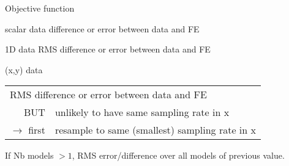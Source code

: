 \begin{frame}{Objective function}
\hfill

\begin{block}{scalar data}
difference or error between data and FE
\end{block}

\begin{block}{1D data}
RMS difference or error between data and FE
\end{block}

{\setlength{\tabcolsep}{.1em}
\begin{block}{(x,y) data}
\begin{tabular}{rl}
\multicolumn{2}{l}{RMS difference or error between data and FE}\\[0.5ex] 
  BUT& unlikely to have same sampling rate in x\\
  $\longrightarrow$ first& resample to same (smallest) sampling rate in x\\
\end{tabular}
\end{block}}
If Nb models $>1$, RMS error/difference over all models of previous value.
\end{frame}
